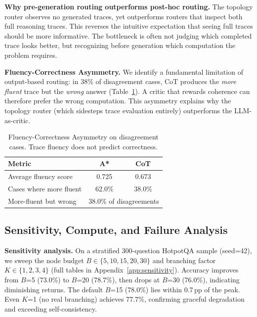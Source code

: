 \documentclass[11pt]{article}
\begin{document}
\textbf{Why pre-generation routing outperforms post-hoc routing.}
The topology router observes no generated traces, yet outperforms routers that inspect both full reasoning traces. This reverses the intuitive expectation that seeing full traces should be more informative. The bottleneck is often not judging which completed trace looks better, but recognizing before generation which computation the problem requires.

\textbf{Fluency-Correctness Asymmetry.}
We identify a fundamental limitation of output-based routing: in 38\% of disagreement cases, CoT produces the \emph{more fluent} trace but the \emph{wrong} answer (Table~\ref{tab:fluency_asymmetry}). A critic that rewards coherence can therefore prefer the wrong computation. This asymmetry explains why the topology router (which sidesteps trace evaluation entirely) outperforms the LLM-as-critic.

\begin{table}[t]
\centering
\small
\begin{tabular}{lcc}
\toprule
\textbf{Metric} & \textbf{A*} & \textbf{CoT} \\
\midrule
Average fluency score & 0.725 & 0.673 \\
Cases where more fluent & 62.0\% & 38.0\% \\
More-fluent but wrong & \multicolumn{2}{c}{38.0\% of disagreements} \\
\bottomrule
\end{tabular}
\caption{Fluency-Correctness Asymmetry on disagreement cases. Trace fluency does not predict correctness.}
\label{tab:fluency_asymmetry}
\end{table}

\subsection{Sensitivity, Compute, and Failure Analysis}
\label{sec:sensitivity}

\textbf{Sensitivity analysis.}
On a stratified 300-question HotpotQA sample (seed=42), we sweep the node budget $B \in \{5,10,15,20,30\}$ and branching factor $K \in \{1,2,3,4\}$ (full tables in Appendix~\ref{app:sensitivity}). Accuracy improves from $B$=5 (73.0\%) to $B$=20 (78.7\%), then drops at $B$=30 (76.0\%), indicating diminishing returns. The default $B$=15 (78.0\%) lies within 0.7\,pp of the peak. Even $K$=1 (no real branching) achieves 77.7\%, confirming graceful degradation and exceeding self-consistency.
\end{document}
